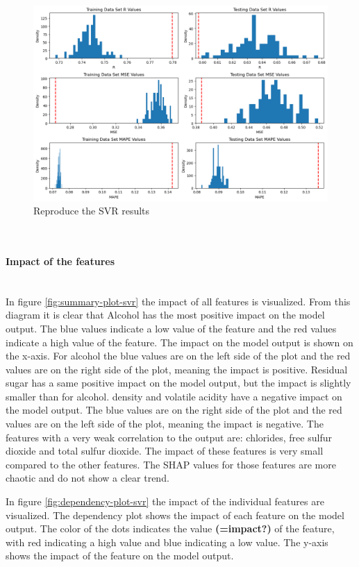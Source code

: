 \documentclass{article}
\newcommand{\subsubsubsection}[1]{%
  \paragraph{#1}\mbox{}\\}
\begin{document}
\begin{figure}
\centering
\includegraphics[width=\linewidth]{figures/SVR_reproduce_the_results.png}
\caption{Reproduce the SVR results}
\label{fig:Reproduce-SVR-the-results}
\end{figure}

\subsubsubsection{Impact of the features}
In figure \autoref{fig:summary-plot-svr}  the impact of all features is visualized.
From this diagram it is clear that Alcohol has the most positive impact on the model output.
The blue values indicate a low value of the feature and the red values indicate a high value of the feature.
The impact on the model output is shown on the x-axis. For alcohol the blue values are on the left side of the plot and the red values are on the right side of the plot, meaning the impact is positive.
Residual sugar has a same positive impact on the model output, but the impact is slightly smaller than for alcohol.
density and volatile acidity have a negative impact on the model output. The blue values are on the right side of the plot and the red values are on the left side of the plot, meaning the impact is negative.
The features with a very weak correlation to the output are: chlorides, free sulfur dioxide and total sulfur dioxide. The impact of these features is very small compared to the other features.
The SHAP values for those features are more chaotic and do not show a clear trend.

In figure \autoref{fig:dependency-plot-svr}  the impact of the individual features are visualized.
The dependency plot shows the impact of each feature on the model output.
The color of the dots indicates the value \textbf{(=impact?)} of the feature, with red indicating a high value and blue indicating a low value.
The y-axis shows the impact of the feature on the model output.
\end{document}
